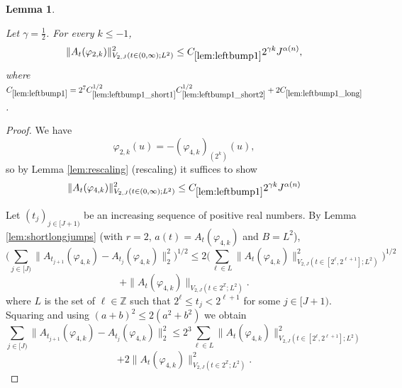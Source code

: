 \documentclass[12pt,reqno]{amsart}
\theoremstyle{plain}
\newtheorem{lemma}[theorem]{Lemma}
\numberwithin{equation}{section}
\theoremstyle{remark}
\newcommand{\uses}[1]{}
\newcommand{\usesdefs}[1]{}
\newcommand{\leanok}{}
\newcommand{\lean}[1]{}
\begin{document}
\begin{lemma}\label{lem:leftbump1}\uses{lem:rescaling,lem:shortlongjumps,lem:leftbump1_long,lem:leftbump1_short1,lem:leftbump1_short2,lem:ftccs-R,lem:ftc_ATphi}\usesdefs{A_def,defn:window based bump functions}
\lean{Auto.leftBumpOne}
\leanok

Let $\gamma=\frac12$. For every $k\le -1$,
\begin{equation}\label{leftbump1}
\|A_{t}(\varphi_{2,k})\|_{V_{2,J}(t\in(0,\infty);L^2)}^2  \le C_{\ref{lem:leftbump1}} 2^{\gamma k} J^{\alpha(n)}, \end{equation}
where  $C_{\ref{lem:leftbump1}}
=2^7C_{\ref{lem:leftbump1_short1}}^{1/2}C_{\ref{lem:leftbump1_short2}}^{1/2}
+2C_{\ref{lem:leftbump1_long}}$.
\end{lemma}

\begin{proof}
We have
\[\varphi_{2,k}(u)=-(\varphi_{4,k})_{(2^k)}(u),\]
so by Lemma \ref{lem:rescaling} (rescaling) it suffices to show
\begin{equation}
\|A_{t}({\varphi_{4,k}}) \|_{V_{2,J}(t\in(0,\infty);L^2)}^2\le C_{\ref{lem:leftbump1}} 2^{\gamma k} J^{\alpha(n)}
\end{equation}

Let $(t_j)_{j\in[J+1)}$ be an increasing sequence of positive real numbers.
By Lemma \ref{lem:shortlongjumps} (with $r=2$, $a(t) = A_t({\varphi_{4,k}}) $ and $B=L^2$),
\begin{equation}  \Big(\sum_{j\in [J)} \|A_{t_{j+1}}({\varphi_{4,k}}) - A_{t_j}({\varphi_{4,k}}) \|_2^2\Big)^{1/2} \le 2 \Big(\sum_{\ell \in L} \|A_t({\varphi_{4,k}}) \|_{V_{2,J}(t\in [2^\ell, 2^{\ell+1}]; L^2)}^2\Big)^{1/2}
\end{equation}
\begin{equation}
+\|A_t({\varphi_{4,k}}) \|_{V_{2,J}(t\in 2^\mathbb{Z}; L^2)}.
\end{equation}
where $L$ is the set of $\ell\in \mathbb{Z}$ such that $2^{\ell}\le t_j<2^{\ell+1}$ for some $j\in [J+1)$.
Squaring and using $(a+b)^2\le 2(a^2+b^2)$ we obtain
\begin{equation}\label{shortlongftc_reduction_pf12} \sum_{j\in [J)} \|A_{t_{j+1}}(\varphi_{4,k})- A_{t_j}(\varphi_{4,k})\|_2^2  \le 2^3 \sum_{\ell \in L} \|A_t(\varphi_{4,k})\|_{V_{2,J}(t\in [2^\ell, 2^{\ell+1}]; L^2)}^2
\end{equation}
\begin{equation}\label{shortlongftc_reduction_pf22}
+ 2 \|A_t(\varphi_{4,k})\|^2_{V_{2,J}(t\in 2^\mathbb{Z}; L^2)}.
\end{equation}


\end{proof}
\end{document}

